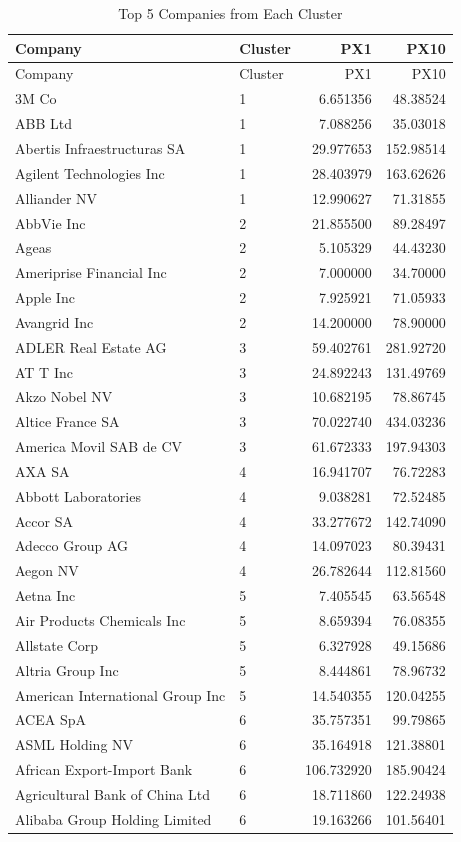 \documentclass[
  letterpaper,
  DIV=11,
  numbers=noendperiod]{scrartcl}
\begin{document}
\hypertarget{tbl-top-5-companies}{}
\begin{longtable}[]{@{}llrr@{}}
\caption{\label{tbl-top-5-companies}Top 5 Companies from Each
Cluster}\tabularnewline
\toprule()
Company & Cluster & PX1 & PX10 \\
\midrule()
\endfirsthead
\toprule()
Company & Cluster & PX1 & PX10 \\
\midrule()
\endhead
3M Co & 1 & 6.651356 & 48.38524 \\
ABB Ltd & 1 & 7.088256 & 35.03018 \\
Abertis Infraestructuras SA & 1 & 29.977653 & 152.98514 \\
Agilent Technologies Inc & 1 & 28.403979 & 163.62626 \\
Alliander NV & 1 & 12.990627 & 71.31855 \\
AbbVie Inc & 2 & 21.855500 & 89.28497 \\
Ageas & 2 & 5.105329 & 44.43230 \\
Ameriprise Financial Inc & 2 & 7.000000 & 34.70000 \\
Apple Inc & 2 & 7.925921 & 71.05933 \\
Avangrid Inc & 2 & 14.200000 & 78.90000 \\
ADLER Real Estate AG & 3 & 59.402761 & 281.92720 \\
AT T Inc & 3 & 24.892243 & 131.49769 \\
Akzo Nobel NV & 3 & 10.682195 & 78.86745 \\
Altice France SA & 3 & 70.022740 & 434.03236 \\
America Movil SAB de CV & 3 & 61.672333 & 197.94303 \\
AXA SA & 4 & 16.941707 & 76.72283 \\
Abbott Laboratories & 4 & 9.038281 & 72.52485 \\
Accor SA & 4 & 33.277672 & 142.74090 \\
Adecco Group AG & 4 & 14.097023 & 80.39431 \\
Aegon NV & 4 & 26.782644 & 112.81560 \\
Aetna Inc & 5 & 7.405545 & 63.56548 \\
Air Products Chemicals Inc & 5 & 8.659394 & 76.08355 \\
Allstate Corp & 5 & 6.327928 & 49.15686 \\
Altria Group Inc & 5 & 8.444861 & 78.96732 \\
American International Group Inc & 5 & 14.540355 & 120.04255 \\
ACEA SpA & 6 & 35.757351 & 99.79865 \\
ASML Holding NV & 6 & 35.164918 & 121.38801 \\
African Export-Import Bank & 6 & 106.732920 & 185.90424 \\
Agricultural Bank of China Ltd & 6 & 18.711860 & 122.24938 \\
Alibaba Group Holding Limited & 6 & 19.163266 & 101.56401 \\
\bottomrule()
\end{longtable}
\end{document}

